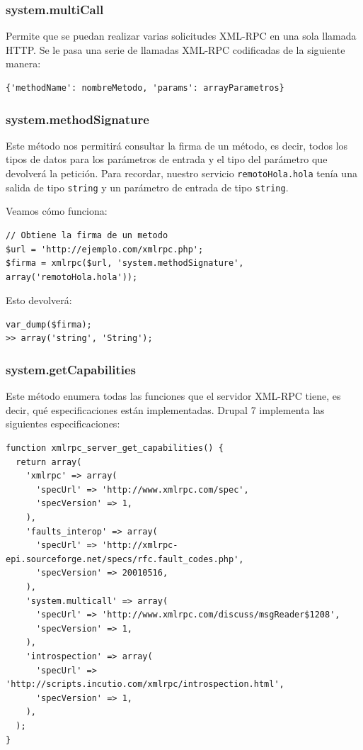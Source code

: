\subsubsection{\large{system.multiCall}}

Permite que se puedan realizar varias solicitudes XML-RPC en una sola llamada HTTP. Se le pasa una serie de 
llamadas XML-RPC codificadas de la siguiente manera:

\begin{verbatim}
{'methodName': nombreMetodo, 'params': arrayParametros}
\end{verbatim}

\subsubsection{\large{system.methodSignature}}

Este método nos permitirá consultar la firma de un método, es decir, todos los tipos de datos para los parámetros 
de entrada y el tipo del parámetro que devolverá la petición. Para recordar, nuestro servicio \verb|remotoHola.hola| 
tenía una salida de tipo \verb|string| y un parámetro de entrada de tipo \verb|string|.   	

Veamos cómo funciona:

\begin{verbatim}
// Obtiene la firma de un metodo
$url = 'http://ejemplo.com/xmlrpc.php';
$firma = xmlrpc($url, 'system.methodSignature', array('remotoHola.hola'));
\end{verbatim}

Esto devolverá:
\begin{verbatim}
var_dump($firma);
>> array('string', 'String');
\end{verbatim}

\subsubsection{\large{system.getCapabilities}}

Este método enumera todas las funciones que el servidor XML-RPC tiene, es decir, qué especificaciones están implementadas.
Drupal 7 implementa las siguientes especificaciones:

\begin{verbatim}
function xmlrpc_server_get_capabilities() {
  return array(
    'xmlrpc' => array(
      'specUrl' => 'http://www.xmlrpc.com/spec', 
      'specVersion' => 1,
    ), 
    'faults_interop' => array(
      'specUrl' => 'http://xmlrpc-epi.sourceforge.net/specs/rfc.fault_codes.php', 
      'specVersion' => 20010516,
    ), 
    'system.multicall' => array(
      'specUrl' => 'http://www.xmlrpc.com/discuss/msgReader$1208', 
      'specVersion' => 1,
    ), 
    'introspection' => array(
      'specUrl' => 'http://scripts.incutio.com/xmlrpc/introspection.html', 
      'specVersion' => 1,
    ),
  );
}
\end{verbatim}

